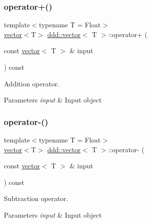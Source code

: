\subsubsection{\texorpdfstring{operator+()}{operator+()}}
{\footnotesize\ttfamily template$<$typename T = Float$>$ \\
\hyperlink{classddd_1_1vector}{vector}$<$T$>$ \hyperlink{classddd_1_1vector}{ddd\+::vector}$<$ T $>$\+::operator+ (\begin{DoxyParamCaption}\item[{const \hyperlink{classddd_1_1vector}{vector}$<$ T $>$ \&}]{input }\end{DoxyParamCaption}) const\hspace{0.3cm}{\ttfamily [inline]}}



Addition operator. 


\begin{DoxyParams}{Parameters}
{\em input} & Input object \\
\hline
\end{DoxyParams}
\mbox{\label{classddd_1_1vector_aa047958a3d0cf3d3ff3d6ff571920ae0}} 
\subsubsection{\texorpdfstring{operator-\/()}{operator-()}}
{\footnotesize\ttfamily template$<$typename T = Float$>$ \\
\hyperlink{classddd_1_1vector}{vector}$<$T$>$ \hyperlink{classddd_1_1vector}{ddd\+::vector}$<$ T $>$\+::operator-\/ (\begin{DoxyParamCaption}\item[{const \hyperlink{classddd_1_1vector}{vector}$<$ T $>$ \&}]{input }\end{DoxyParamCaption}) const\hspace{0.3cm}{\ttfamily [inline]}}



Subtraction operator. 


\begin{DoxyParams}{Parameters}
{\em input} & Input object \\
\hline
\end{DoxyParams}
\mbox{\label{classddd_1_1vector_a837824860826c44950c2c48d4bd247e3}} 
